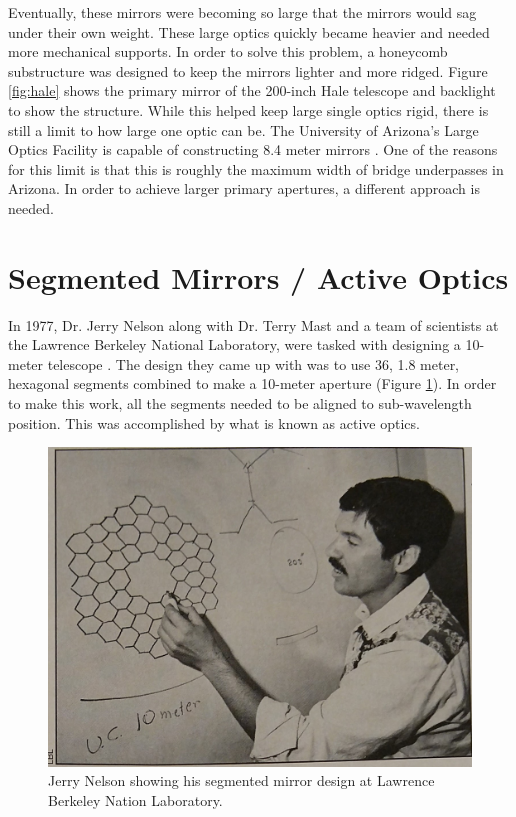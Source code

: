Eventually, these mirrors were becoming so
large that the mirrors would sag under their own weight.  These large optics quickly became heavier and needed
more mechanical supports.  In order to solve this problem, a honeycomb substructure was designed to keep the
mirrors lighter and more ridged.  Figure \ref{fig:hale} shows the primary mirror of the 200-inch Hale telescope
and backlight to show the structure.  While this helped keep large single optics rigid, there is still a limit
to how large one optic can be.  The University of Arizona's Large Optics Facility is capable of constructing
8.4 meter mirrors \cite{LOFTSystems.}.  One of the reasons for this limit is that this is roughly the maximum
width of bridge underpasses in Arizona.  In order to achieve larger primary apertures, a different approach is
needed.




\section{Segmented Mirrors / Active Optics}
\label{sec:seg_mirror}

In 1977, Dr. Jerry Nelson along with Dr. Terry Mast and a team of scientists at the Lawrence Berkeley National Laboratory, were tasked with designing a 10-meter telescope \cite{BeatingObservatory}.  The design they came up with was to use 36, 1.8 meter, hexagonal segments combined to make a 10-meter aperture (Figure \ref{fig:jerry_nelson}).  In order to make this work, all the segments needed to be aligned to sub-wavelength position.  This was accomplished by what is known as active optics.

\begin{figure}[H]
\centering
\includegraphics[width=12 cm]{../Figures/Jerry Nelson}
\caption{Jerry Nelson showing his segmented mirror design at Lawrence Berkeley Nation Laboratory.}
\label{fig:jerry_nelson}
\end{figure}

